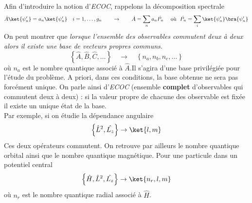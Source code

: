 Afin d'introduire la notion d'\textit{ECOC}, rappelons la décomposition spectrale
\begin{equation}
\hat{A}\ket{\psi_n'} = a_n\ket{\psi_n'}\quad i=1,\dots,g_n\qquad\rightarrow\qquad
\hat{A} = \sum_na_n\hat{P_n}\quad\text{ où }\ \hat{P_n}=\sum_i\ket{\psi_n'}\bra{
\psi_n'}
\end{equation}
On peut montrer que \textit{lorsque l'ensemble des observables commutent
deux à deux alors il existe une base de vecteurs propres communs.} 
\begin{equation}
\left\{\hat{A},\hat{B},\hat{C},\dots\right\}\quad\rightarrow\quad \left\{n_a,
n_b,n_c,\dots\right\}
\end{equation}
où $n_a$ est le nombre quantique associé à $\hat{A}$.Il s'agira  d'une base 
privilégiée pour l'étude du problème. A priori, dans ces conditions,
la base obtenue ne sera pas forcément unique. On parle ainsi d'\textit{ECOC} 
(ensemble \textbf{complet} d'observables qui commutent deux à deux) : si la 
valeur propre de chacune des observable est fixée il existe un unique état de 
la base. \\

Par exemple, si on étudie la dépendance angulaire
\begin{equation}
\left\{\hat{L}^2, \hat{L_z}\right\} \rightarrow \ket{l,m}
\end{equation}
Ces deux opérateurs commutent. On retrouve par ailleurs le nombre quantique 
orbital ainsi que le nombre quantique magnétique. Pour une particule dans un 
potentiel central 
\begin{equation}
\left\{\hat{H},\hat{L}^2, \hat{L_z}\right\} \rightarrow \ket{n_r,l,m}
\end{equation}
où $n_r$ est le nombre quantique radial associé à $\hat{H}$.
